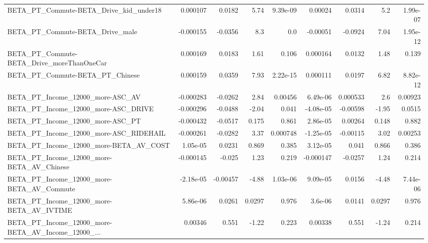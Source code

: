 \begin{tabular}{lrrrrrrrr}
BETA\_PT\_Commute-BETA\_Drive\_kid\_under18             &    0.000107 &       0.0182 &      5.74 & 9.39e-09 &    0.00024 &      0.0314 &          5.2 &      1.99e-07 \\
BETA\_PT\_Commute-BETA\_Drive\_male                    &   -0.000155 &      -0.0356 &       8.3 &      0.0 &   -0.00051 &     -0.0924 &         7.04 &      1.95e-12 \\
BETA\_PT\_Commute-BETA\_Drive\_moreThanOneCar          &    0.000169 &       0.0183 &      1.61 &    0.106 &   0.000164 &      0.0132 &         1.48 &         0.139 \\
BETA\_PT\_Commute-BETA\_PT\_Chinese                    &    0.000159 &       0.0359 &      7.93 & 2.22e-15 &   0.000111 &      0.0197 &         6.82 &      8.82e-12 \\
BETA\_PT\_Income\_12000\_more-ASC\_AV                   &   -0.000283 &      -0.0262 &      2.84 &  0.00456 &   6.49e-06 &    0.000533 &          2.6 &       0.00923 \\
BETA\_PT\_Income\_12000\_more-ASC\_DRIVE                &   -0.000296 &      -0.0488 &     -2.04 &    0.041 &  -4.08e-05 &    -0.00598 &        -1.95 &        0.0515 \\
BETA\_PT\_Income\_12000\_more-ASC\_PT                   &   -0.000432 &      -0.0517 &     0.175 &    0.861 &   2.86e-05 &     0.00264 &        0.148 &         0.882 \\
BETA\_PT\_Income\_12000\_more-ASC\_RIDEHAIL             &   -0.000261 &      -0.0282 &      3.37 & 0.000748 &  -1.25e-05 &    -0.00115 &         3.02 &       0.00253 \\
BETA\_PT\_Income\_12000\_more-BETA\_AV\_COST             &    1.05e-05 &       0.0231 &     0.869 &    0.385 &   3.12e-05 &       0.041 &        0.866 &         0.386 \\
BETA\_PT\_Income\_12000\_more-BETA\_AV\_Chinese          &   -0.000145 &       -0.025 &      1.23 &    0.219 &  -0.000147 &     -0.0257 &         1.24 &         0.214 \\
BETA\_PT\_Income\_12000\_more-BETA\_AV\_Commute          &   -2.18e-05 &     -0.00457 &     -4.88 & 1.03e-06 &   9.09e-05 &      0.0156 &        -4.48 &      7.44e-06 \\
BETA\_PT\_Income\_12000\_more-BETA\_AV\_IVTIME           &    5.86e-06 &       0.0261 &    0.0297 &    0.976 &    3.6e-06 &      0.0141 &       0.0297 &         0.976 \\
BETA\_PT\_Income\_12000\_more-BETA\_AV\_Income\_12000\_... &     0.00346 &        0.551 &     -1.22 &    0.223 &    0.00338 &       0.551 &        -1.24 &         0.214 \\

\end{tabular}
